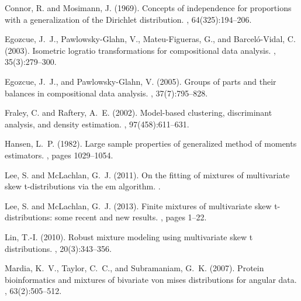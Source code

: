 \documentclass[preprint, review, 3p, authoryear]{elsarticle}
\begin{document}
\begin{thebibliography}{00}
Connor, R. and Mosimann, J. (1969).
\newblock Concepts of independence for proportions with a generalization of the
  {D}irichlet distribution.
,
  64(325):194--206.

Egozcue, J.~J., Pawlowsky-Glahn, V., Mateu-Figueras, G., and Barcel{\'o}-Vidal,
  C. (2003).
\newblock Isometric logratio transformations for compositional data analysis.
, 35(3):279--300.

Egozcue, J.~J., and Pawlowsky-Glahn, V. (2005).
\newblock Groups of parts and their balances in compositional data analysis.
, 37(7):795--828.

Fraley, C. and Raftery, A.~E. (2002).
\newblock Model-based clustering, discriminant analysis, and density
  estimation.
,
  97(458):611--631.

Hansen, L.~P. (1982).
\newblock Large sample properties of generalized method of moments estimators.
, pages
  1029--1054.

Lee, S. and McLachlan, G.~J. (2011).
\newblock On the fitting of mixtures of multivariate skew t-distributions via
  the em algorithm.
.

Lee, S. and McLachlan, G.~J. (2013).
\newblock Finite mixtures of multivariate skew t-distributions: some recent and
  new results.
, pages 1--22.

Lin, T.-I. (2010).
\newblock Robust mixture modeling using multivariate skew t distributions.
, 20(3):343--356.


Mardia, K.~V., Taylor, C.~C., and Subramaniam, G.~K. (2007).
\newblock Protein bioinformatics and mixtures of bivariate von mises
  distributions for angular data.
, 63(2):505--512.


\end{thebibliography}
\end{document}

